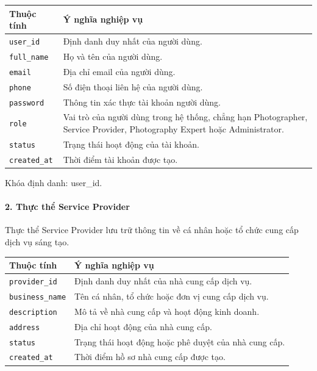 \begin{center}
\scriptsize
\begin{tabular}{p{.32\linewidth} p{.58\linewidth}}
\toprule
Thuộc tính & Ý nghĩa nghiệp vụ \\
\midrule
\texttt{user\_id} & Định danh duy nhất của người dùng. \\
\texttt{full\_name} & Họ và tên của người dùng. \\
\texttt{email} & Địa chỉ email của người dùng. \\
\texttt{phone} & Số điện thoại liên hệ của người dùng. \\
\texttt{password} & Thông tin xác thực tài khoản người dùng. \\
\texttt{role} & Vai trò của người dùng trong hệ thống, chẳng hạn Photographer, Service Provider, Photography Expert hoặc Administrator. \\
\texttt{status} & Trạng thái hoạt động của tài khoản. \\
\texttt{created\_at} & Thời điểm tài khoản được tạo. \\
\bottomrule
\end{tabular}
\end{center}

Khóa định danh: user\_id.

\paragraph{2. Thực thể Service Provider}\mbox{}\par

Thực thể Service Provider lưu trữ thông tin về cá nhân hoặc tổ chức cung cấp dịch vụ sáng tạo.

\begin{center}
\scriptsize
\begin{tabular}{p{.25\linewidth} p{.65\linewidth}}
\toprule
Thuộc tính & Ý nghĩa nghiệp vụ \\
\midrule
\texttt{provider\_id} & Định danh duy nhất của nhà cung cấp dịch vụ. \\
\texttt{business\_name} & Tên cá nhân, tổ chức hoặc đơn vị cung cấp dịch vụ. \\
\texttt{description} & Mô tả về nhà cung cấp và hoạt động kinh doanh. \\
\texttt{address} & Địa chỉ hoạt động của nhà cung cấp. \\
\texttt{status} & Trạng thái hoạt động hoặc phê duyệt của nhà cung cấp. \\
\texttt{created\_at} & Thời điểm hồ sơ nhà cung cấp được tạo. \\
\bottomrule
\end{tabular}
\end{center}

